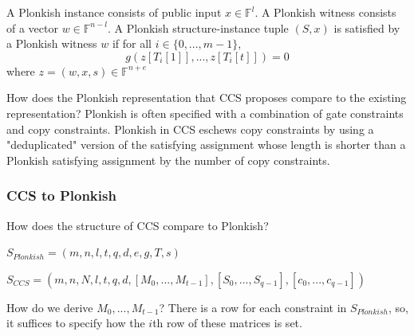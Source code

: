 \documentclass[
    9pt,            %
    techreport,        %
    affiltop,       %
]{art}
\begin{document}
A Plonkish instance consists of public input $x \in \mathbb{F}^l$. A Plonkish witness consists of a vector $w \in \mathbb{F}^{n-l}$. A Plonkish structure-instance tuple $(S, x)$ is satisfied by a Plonkish witness $w$ if for all $i \in \{ 0,..., m-1\}$,
\begin{equation}
    g(z[T_i[1]], ..., z[T_i[t]]) = 0
\end{equation}
where $z = (w, x, s) \in \mathbb{F}^{n+e}$

How does the Plonkish representation that CCS proposes compare to the existing representation?
Plonkish is often specified with a combination of gate constraints and copy constraints. Plonkish in CCS eschews copy constraints by using a "deduplicated" version of the satisfying assignment whose length is shorter than a Plonkish satisfying assignment by the number of copy constraints.

\subsubsection{CCS to Plonkish}
How does the structure of CCS compare to Plonkish?

$S_{Plonkish}=(m,n,l,t,q,d,e,g,T,s)$

$S_{CCS}=(m,n,N,l,t,q,d,[M_0,...,M_{t-1}], [S_0,...,S_{q-1}], [c_0,...,c_{q-1}])$



How do we derive $M_0,..., M_{t-1}$?
There is a row for each constraint in $S_{Plonkish}$, so, it suffices to specify how the $i$th row of these matrices is set. 
\end{document}
